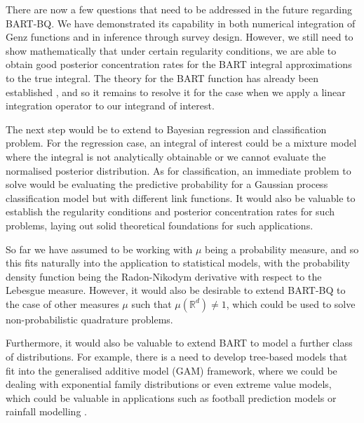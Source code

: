 There are now a few questions that need to be addressed in the future regarding BART-BQ. We have demonstrated its capability in both numerical integration of Genz functions and in inference through survey design. However, we still need to show mathematically that under certain regularity conditions, we are able to obtain good posterior concentration rates for the BART integral approximations to the true integral. The theory for the BART function has already been established \cite{rockova2019theory}, and so it remains to resolve it for the case when we apply a linear integration operator to our integrand of interest.

The next step would be to extend to Bayesian regression and classification problem. For the regression case, an integral of interest could be a mixture model where the integral is not analytically obtainable or we cannot evaluate the normalised posterior distribution. As for classification, an immediate problem to solve would be evaluating the predictive probability for a Gaussian process classification model \cite{Rasmussen:2005:GPM:1162254} but with different link functions. It would also be valuable to establish the regularity conditions and posterior concentration rates for such problems, laying out solid theoretical foundations for such applications.

So far we have assumed to be working with $\mu$ being a probability measure, and so this fits naturally into the application to statistical models, with the probability density function being the Radon-Nikodym derivative with respect to the Lebesgue measure. However, it would also be desirable to extend BART-BQ to the case of other measures $\mu$ such that $\mu(\mathbb{R}^d) \neq 1$, which could be used to solve non-probabilistic quadrature problems.

Furthermore, it would also be valuable to extend BART to model a further class of distributions. For example, there is a need to develop tree-based models that fit into the generalised additive model (GAM) framework, where we could be dealing with exponential family distributions or even extreme value models, which could be valuable in applications such as football prediction models \cite{doi:10.1080/02664760802684177} or rainfall modelling \cite{doi:10.1146/annurev-statistics-010814-020133}. 


